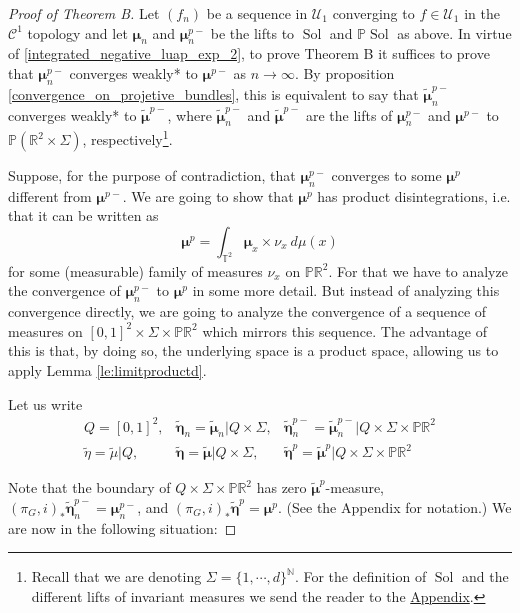 \documentclass[11pt,letterpaper,reqno]{article}
\newcommand{\Pp}{\mathbb P}
\newcommand{\N}{\mathbb{N}}
\newcommand{\TT}{\mathbb{T}^2}
\newcommand{\RR}{\mathbb{R}^2}
\newcommand{\tmu}{\tilde{\mu}}
\newcommand{\bmu}{\boldsymbol{\mu}}
\newcommand{\tbmu}{\tilde{\bmu}}
\newcommand{\teta}{\tilde{\eta}}
\newcommand{\tbeta}{\tilde{\boldsymbol{\eta}}}
\newcommand{\Sol}{\operatorname{Sol}}
\begin{document}
\begin{proof}[Proof of Theorem B]

Let $(f_n)$ be a sequence in $\mathcal U_1$ converging to $f\in\mathcal U_1$ in the $\mathcal C^1$ topology and let $\bmu_n$ and $\bmu_n^{p-}$ be the lifts to $\Sol$ and $\Pp \Sol$ as above. In virtue of \eqref{integrated_negative_luap_exp_2}, to prove Theorem B it suffices to prove that $\bmu_n^{p-}$ converges weakly* to $\bmu^{p-}$ as $n \to \infty$.
By proposition \ref{convergence_on_projetive_bundles}, this is equivalent to say that $\tbmu_n^{p-}$ converges weakly* to $\tbmu^{p-}$, where $\tbmu_n^{p-}$ and $\tbmu^{p-}$ are the lifts of $\bmu_n^{p-}$ and $\bmu^{p-}$ to $\Pp (\RR \times \Sigma)$, respectively\footnote{Recall that we are denoting $\Sigma=\{1,\cdots, d\}^{\N}$. For the definition of $\Sol$ and the different lifts of invariant measures we send the reader to the \hyperlink{sec:appendix}{Appendix}.}. 

Suppose, for the purpose of contradiction, that $\bmu_n^{p-}$ converges to some $\bmu^p$ different from $\bmu^{p-}$. We are going to show that $\bmu^p$ has product disintegrations, i.e. that it can be written as
\begin{equation} \label{structure_of_bmup} 
\bmu^p = \int_{\TT} \bmu_x \times \nu_x \ d\mu(x) 
\end{equation}
for some (measurable) family of measures $\nu_x$ on $\Pp \RR$. For that we have to analyze the convergence of $\bmu_n^{p-}$ to $\bmu^p$ in some more detail. But instead of analyzing this convergence directly, we are going to analyze the convergence of a sequence of measures on $[0,1]^2 \times \Sigma \times \Pp \RR$ which mirrors this sequence. The advantage of this is that, by doing so, the underlying space is a product space, allowing us to apply Lemma \ref{le:limitproductd}.


Let us write
\[
\begin{array}{lll}
Q = [0,1]^2, & \tbeta_n = \tbmu_n \vert Q \times \Sigma,  & \tbeta_n^{p-} = \tbmu_n^{p-} \vert Q \times \Sigma \times \Pp \RR \\
\teta = \tmu \vert Q, & \tbeta = \tbmu \vert Q \times \Sigma,  & \tbeta^{p} = \tbmu^{p} \vert Q \times \Sigma \times \Pp \RR
\end{array}
\]

Note that the boundary of $Q \times \Sigma \times \Pp \RR$ has zero $\tbmu^{p}$-measure, $(\pi_G,i)_* \tbeta_n^{p-} = \bmu_n^{p-}$, and $(\pi_G,i)_* \tbeta^p = \bmu^p$. (See the Appendix for notation.) We are now in the following situation:


\end{proof}
\end{document}
